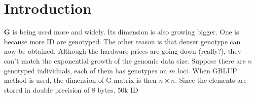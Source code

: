 \documentclass[a4]{article}
\begin{document}
\section{Introduction}
$\mathbf{G}$ is being used more and widely.
Its dimension is also growing bigger.
One is because more ID are genotyped.
The other reason is that denser genotype can now be obtained.
Although the hardware prices are going down (really?),
they can't match the exponential growth of the genomic data size.
Suppose there are $n$ genotyped individuals,
each of them has genotypes on $m$ loci.
When GBLUP method is used,
the dimension of G matrix is then $n\times n$.
Since the elements are stored in double precision of 8 bytes,
50k ID 
\end{document}
